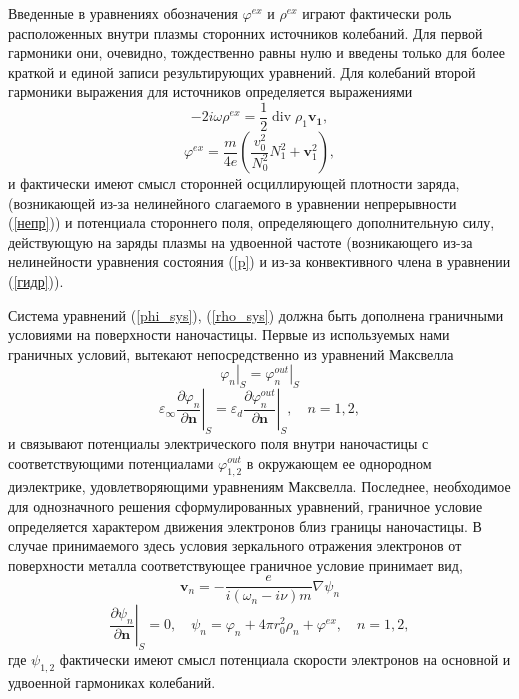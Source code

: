 \documentclass[12pt, a4paper]{article}
\renewcommand{\vec}{\mathbf}
\def \eps {\varepsilon}
\def \w {\omega}
\def \ph {\varphi}
\newcommand{\dn}[1]{\left.\frac{\partial #1}{\partial \vec{n}}\right|_{ S}}
\begin{document}
Введенные в уравнениях обозначения $\ph^{ex}$ и $\rho^{ex}$ играют фактически роль расположенных внутри плазмы сторонних источников колебаний. Для первой гармоники они, очевидно, тождественно равны нулю и введены только для более краткой и единой записи результирующих уравнений. Для колебаний второй гармоники выражения для источников определяется выражениями 
\begin{equation}
	\label{rho_ex}
 - 2i\w \rho^{ex} = \frac{1}{2}\operatorname{div} \rho_1 \vec{v_1},
\end{equation}
\begin{equation}
	\label{phi_ex}
\ph^{ex} = \frac{m}{4e}\left(\frac{v_0^2}{N_0^2}N_1^2 + \vec{v}_1^2\right),
\end{equation}
и фактически имеют смысл сторонней осциллирующей плотности заряда, (возникающей из-за нелинейного слагаемого в уравнении непрерывности (\ref{непр})) и потенциала стороннего поля, определяющего дополнительную силу, действующую на заряды плазмы на удвоенной частоте (возникающего из-за нелинейности уравнения состояния (\ref{p}) и из-за конвективного члена в уравнении (\ref{гидр})). 

Система уравнений (\ref{phi_sys}), (\ref{rho_sys}) должна быть дополнена граничными условиями на поверхности наночастицы. Первые из используемых нами граничных условий, вытекают непосредственно из уравнений Максвелла
\begin{equation} 
	\left. \ph_n \right|_{ S} = \left. \ph_n^{out} \right|_{ S} 
\end{equation}
\begin{equation} 
	\eps_\infty \dn{\ph_n} = \eps_d \dn{\ph_n^{out}}, \quad n = 1,2,  
\end{equation}
и связывают потенциалы электрического поля внутри наночастицы с соответствующими потенциалами $\ph_{1,2}^{out}$ в окружающем ее однородном диэлектрике, удовлетворяющими уравнениям Максвелла.
Последнее, необходимое для однозначного решения сформулированных уравнений, граничное условие определяется характером движения электронов близ границы наночастицы. В случае принимаемого здесь условия зеркального отражения электронов от поверхности металла соответствующее граничное условие принимает вид, 
\begin{equation} 
	\label{v}
\vec{v}_n = -\frac{e}{i(\w_n - i\nu)m} \nabla \psi_n
\end{equation}
\begin{equation} 
	\label{psi}
\dn{\psi_n}	= 0, \quad \psi_n = \ph_n + 4 \pi r_0^2 \rho_n + \ph^{ex}, \quad n = 1,2,  
\end{equation}
где $\psi_{1,2}$ фактически имеют смысл потенциала скорости электронов на основной и удвоенной гармониках колебаний.
\end{document}
